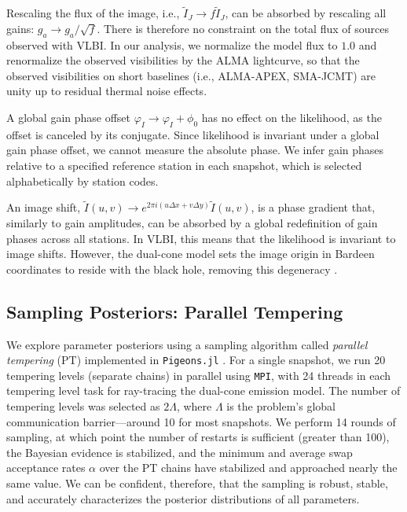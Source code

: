 \documentclass[linenumbers, twocolumn, tighten]{aastex701}
\begin{document}
Rescaling the flux of the image, i.e., $\tilde{I}_J \rightarrow f\tilde{I}_J$, can be absorbed by rescaling all gains: $g_a \to g_a/\sqrt{f}$. There is therefore no constraint on the total flux of sources observed with VLBI. In our analysis, we normalize the model flux to $1.0$ and renormalize the observed visibilities by the ALMA lightcurve, so that the observed visibilities on short baselines (i.e., ALMA-APEX, SMA-JCMT) are unity up to residual thermal noise effects. 

A global gain phase offset $\varphi_I \rightarrow\varphi_I + \phi_0$ has no effect on the likelihood, as the offset is canceled by its conjugate. Since likelihood is invariant under a global gain phase offset, we cannot measure the absolute phase. We infer gain phases relative to a specified reference station in each snapshot, which is selected alphabetically by station codes.

An image shift, $\tilde{I}(u,v) \to e^{2\pi i (u\Delta x + v\Delta y)}\tilde{I}(u,v)$, is a phase gradient that, similarly to gain amplitudes, can be absorbed by a global redefinition of gain phases across all stations. In VLBI, this means that the likelihood is invariant to image shifts. However, the dual-cone model sets the image origin in Bardeen coordinates to reside with the black hole, removing this degeneracy \citep{Bardeen_Cunnigham_1973}.


\subsection{Sampling Posteriors: Parallel Tempering} \label{subsec:pigeons}

We explore parameter posteriors using a sampling algorithm called \textit{parallel tempering} (PT) implemented in \texttt{Pigeons.jl} \citep{2023arXiv230809769S}. For a single snapshot, we run 20 tempering levels (separate chains) in parallel using \texttt{MPI}, with 24 threads in each tempering level task for ray-tracing the dual-cone emission model. The number of tempering levels was selected as $2\Lambda$, where $\Lambda$ is the problem's global communication barrier---around 10 for most snapshots. We perform 14 rounds of sampling, at which point the number of restarts is sufficient (greater than 100), the Bayesian evidence is stabilized, and the minimum and average swap acceptance rates $\alpha$ over the PT chains have stabilized and approached nearly the same value. We can be confident, therefore, that the sampling is robust, stable, and accurately characterizes the posterior distributions of all parameters.
\end{document}
